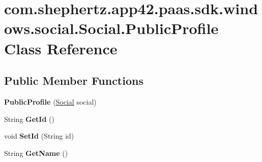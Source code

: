 \hypertarget{classcom_1_1shephertz_1_1app42_1_1paas_1_1sdk_1_1windows_1_1social_1_1_social_1_1_public_profile}{\section{com.\+shephertz.\+app42.\+paas.\+sdk.\+windows.\+social.\+Social.\+Public\+Profile Class Reference}
\label{classcom_1_1shephertz_1_1app42_1_1paas_1_1sdk_1_1windows_1_1social_1_1_social_1_1_public_profile}
}
\subsection*{Public Member Functions}
\begin{DoxyCompactItemize}
\item 
\hypertarget{classcom_1_1shephertz_1_1app42_1_1paas_1_1sdk_1_1windows_1_1social_1_1_social_1_1_public_profile_a9d34a824db941aebe956fb970b51e331}{{\bfseries Public\+Profile} (\hyperlink{classcom_1_1shephertz_1_1app42_1_1paas_1_1sdk_1_1windows_1_1social_1_1_social}{Social} social)}\label{classcom_1_1shephertz_1_1app42_1_1paas_1_1sdk_1_1windows_1_1social_1_1_social_1_1_public_profile_a9d34a824db941aebe956fb970b51e331}

\item 
\hypertarget{classcom_1_1shephertz_1_1app42_1_1paas_1_1sdk_1_1windows_1_1social_1_1_social_1_1_public_profile_abe1247f2545590b9c54ef8be13d8e393}{String {\bfseries Get\+Id} ()}\label{classcom_1_1shephertz_1_1app42_1_1paas_1_1sdk_1_1windows_1_1social_1_1_social_1_1_public_profile_abe1247f2545590b9c54ef8be13d8e393}

\item 
\hypertarget{classcom_1_1shephertz_1_1app42_1_1paas_1_1sdk_1_1windows_1_1social_1_1_social_1_1_public_profile_a306b7a6acb22c614857849959cd93d79}{void {\bfseries Set\+Id} (String id)}\label{classcom_1_1shephertz_1_1app42_1_1paas_1_1sdk_1_1windows_1_1social_1_1_social_1_1_public_profile_a306b7a6acb22c614857849959cd93d79}

\item 
\hypertarget{classcom_1_1shephertz_1_1app42_1_1paas_1_1sdk_1_1windows_1_1social_1_1_social_1_1_public_profile_a810cc5848b5eadf92cab57539ade84fb}{String {\bfseries Get\+Name} ()}\label{classcom_1_1shephertz_1_1app42_1_1paas_1_1sdk_1_1windows_1_1social_1_1_social_1_1_public_profile_a810cc5848b5eadf92cab57539ade84fb}


\end{DoxyCompactItemize}
